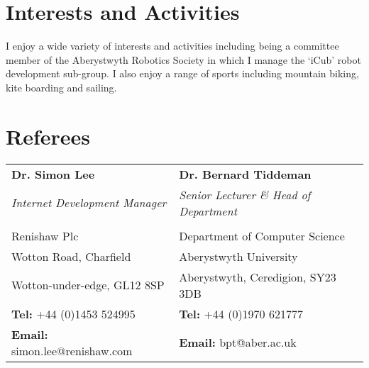 \documentclass[a4paper, 10pt]{extarticle} %
\begin{document}

\section{Interests and Activities}

{\small I enjoy a wide variety of interests and activities including being a committee member of the Aberystwyth Robotics Society in which I manage the `iCub’ robot development sub-group. I also enjoy a range of sports including mountain biking, kite boarding and sailing.}

\section{Referees}

\begin{tabularx}{\textwidth}{X X}

\textbf{Dr. Simon Lee} & \textbf{Dr. Bernard Tiddeman} \\
\textit{Internet Development Manager} & \textit{Senior Lecturer \& Head of Department} \\\\ 

Renishaw Plc & Department of Computer Science \\ 
Wotton Road, Charfield & Aberystwyth University \\ 
Wotton-under-edge, GL12 8SP & Aberystwyth, Ceredigion, SY23 3DB  \\
\textbf{Tel:} +44 (0)1453 524995 & \textbf{Tel:}  +44 (0)1970 621777 \\
\textbf{Email:} simon.lee@renishaw.com & \textbf{Email:} bpt@aber.ac.uk

\end{tabularx}



\end{document}
